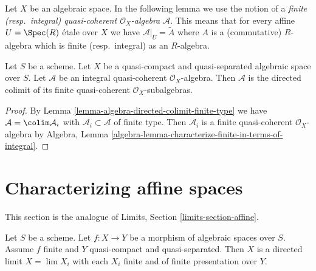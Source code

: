 \noindent
Let $X$ be an algebraic space. In the following lemma we use the notion
of a {\it finite (resp.\ integral) quasi-coherent
$\mathcal{O}_X$-algebra $\mathcal{A}$}. This means that for every
affine $U = \Spec(R)$ \'etale over $X$ we have
$\mathcal{A}|_U = \widetilde{A}$ where $A$ is a (commutative) $R$-algebra
which is finite (resp.\ integral) as an $R$-algebra.

\begin{lemma}
\label{lemma-integral-algebra-directed-colimit-finite}
Let $S$ be a scheme. Let $X$ be a quasi-compact and quasi-separated
algebraic space over $S$.
Let $\mathcal{A}$ be an integral quasi-coherent $\mathcal{O}_X$-algebra.
Then $\mathcal{A}$ is the directed colimit of its finite
quasi-coherent $\mathcal{O}_X$-subalgebras.
\end{lemma}

\begin{proof}
By Lemma \ref{lemma-algebra-directed-colimit-finite-type} we have
$\mathcal{A} = \colim \mathcal{A}_i$ with $\mathcal{A}_i \subset \mathcal{A}$
of finite type. Then $\mathcal{A}_i$ is a finite quasi-coherent
$\mathcal{O}_X$-algebra by Algebra, Lemma
\ref{algebra-lemma-characterize-finite-in-terms-of-integral}.
\end{proof}






\section{Characterizing affine spaces}
\label{section-affine}

\noindent
This section is the analogue of Limits, Section \ref{limits-section-affine}.

\begin{lemma}
\label{lemma-finite-in-finite-and-finite-presentation}
Let $S$ be a scheme. Let $f : X \to Y$ be a morphism of algebraic
spaces over $S$. Assume $f$ finite and $Y$ quasi-compact and quasi-separated.
Then $X$ is a directed limit $X = \lim X_i$ with each $X_i$ finite and of
finite presentation over $Y$.
\end{lemma}

